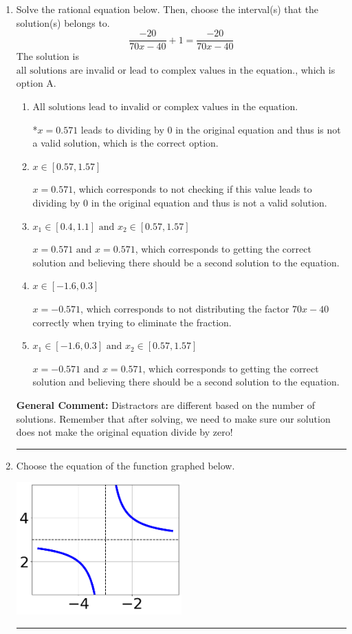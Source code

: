 \documentclass{extbook}[14pt]
\newcommand{\litem}[1]{\item #1

\rule{\textwidth}{0.4pt}}
\begin{document}
\begin{enumerate}\litem{
Solve the rational equation below. Then, choose the interval(s) that the solution(s) belongs to.
\[ \frac{-20}{70x -40} + 1 = \frac{-20}{70x -40} \]The solution is \( \text{all solutions are invalid or lead to complex values in the equation.} \), which is option A.\begin{enumerate}[label=\Alph*.]
\item \( \text{All solutions lead to invalid or complex values in the equation.} \)

*$x = 0.571$ leads to dividing by 0 in the original equation and thus is not a valid solution, which is the correct option.
\item \( x \in [0.57,1.57] \)

$x = 0.571$, which corresponds to not checking if this value leads to dividing by 0 in the original equation and thus is not a valid solution.
\item \( x_1 \in [0.4, 1.1] \text{ and } x_2 \in [0.57,1.57] \)

$x = 0.571 \text{ and } x = 0.571$, which corresponds to getting the correct solution and believing there should be a second solution to the equation.
\item \( x \in [-1.6,0.3] \)

$x = -0.571$, which corresponds to not distributing the factor $70x -40$ correctly when trying to eliminate the fraction.
\item \( x_1 \in [-1.6, 0.3] \text{ and } x_2 \in [0.57,1.57] \)

$x = -0.571 \text{ and } x = 0.571$, which corresponds to getting the correct solution and believing there should be a second solution to the equation.
\end{enumerate}

\textbf{General Comment:} Distractors are different based on the number of solutions. Remember that after solving, we need to make sure our solution does not make the original equation divide by zero!
}
\litem{
Choose the equation of the function graphed below.

\begin{center}
    \includegraphics[width=0.5\textwidth]{../Figures/rationalGraphToEquationB.png}
\end{center}


}
\end{enumerate}
\end{document}
